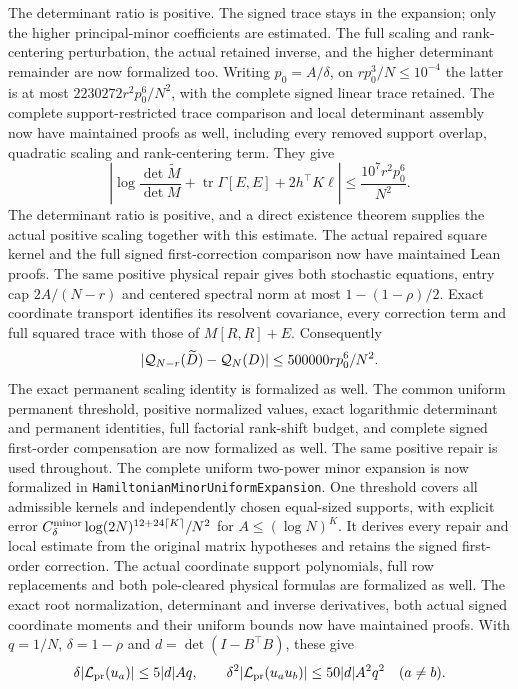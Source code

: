 \documentclass[11pt]{article}
\theoremstyle{remark}
\begin{document}
The determinant ratio is positive. The signed trace stays in the
expansion; only the higher principal-minor coefficients are estimated.
The full scaling and rank-centering perturbation, the actual retained
inverse, and the higher determinant remainder are now formalized too.
Writing \(p_0=A/\delta\), on \(rp_0^3/N\leq10^{-4}\) the latter is at most
\(2230272r^2p_0^6/N^2\), with the complete signed linear trace retained.
The complete support-restricted trace comparison and local determinant
assembly now have maintained proofs as well, including every removed
support overlap, quadratic scaling and rank-centering term. They give
\[
 \left|\log\frac{\det\widetilde M}{\det M}
       +\operatorname{tr}\Gamma[E,E]+2h^\top K\ell\right|
 \leq\frac{10^7r^2p_0^6}{N^2}.
\]
The determinant ratio is positive, and a direct existence theorem
supplies the actual positive scaling together with this estimate.
The actual repaired square kernel and the full signed
first-correction comparison now have maintained Lean proofs.
The same positive physical repair gives both stochastic equations,
entry cap \(2A/(N-r)\) and centered spectral norm at most
\(1-(1-\rho)/2\). Exact coordinate transport identifies its
resolvent covariance, every correction term and full squared trace
with those of \(M[R,R]+E\). Consequently
\[
 |{\cal Q}_{N-r}(\widetilde D)-{\cal Q}_N(D)|
       \leq500000rp_0^6/N^2.
\]
The exact permanent scaling identity is formalized as well.
The common uniform permanent threshold, positive normalized values,
exact logarithmic determinant and permanent identities, full factorial
rank-shift budget, and complete signed first-order compensation are
now formalized as well. The same positive repair is used throughout.
The complete uniform two-power minor expansion is now formalized in
\texttt{HamiltonianMinorUniformExpansion}. One threshold covers all
admissible kernels and independently chosen equal-sized supports,
with explicit error \(C_\delta^{\rm minor}
\log(2N)^{12+24\lceil K\rceil}/N^2\) for
\(A\leq(\log N)^K\). It derives every repair and local estimate
from the original matrix hypotheses and retains the signed
first-order correction. The actual coordinate support polynomials,
full row replacements and both pole-cleared physical formulas are
formalized as well. The exact root normalization, determinant and
inverse derivatives, both actual signed coordinate moments and their
uniform bounds now have maintained proofs. With \(q=1/N\),
\(\delta=1-\rho\) and \(d=\det(I-B^\top B)\), these give
\[
 \delta|{\cal L}_{\rm pr}(u_a)|\leq5|d|Aq,\qquad
 \delta^2|{\cal L}_{\rm pr}(u_au_b)|
       \leq50|d|A^2q^2\quad(a\ne b).
\]
\end{document}
